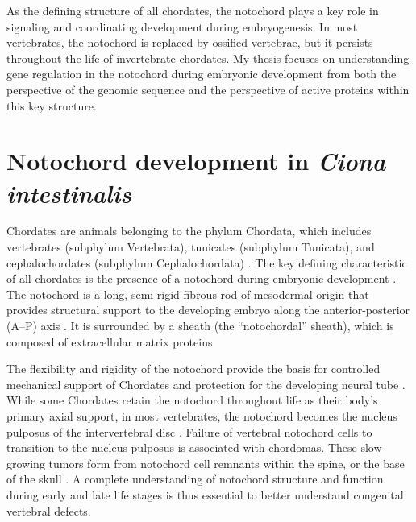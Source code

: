 \begin{dissertationintroduction}
    As the defining structure of all chordates, the notochord plays a key role in signaling and coordinating development during embryogenesis. In most vertebrates, the notochord is replaced by ossified vertebrae, but it persists throughout the life of invertebrate chordates. My thesis focuses on understanding gene regulation in the notochord during embryonic development from both the perspective of the genomic sequence and the perspective of active proteins within this key structure. 
    
    \section{Notochord development in \textit{Ciona intestinalis}}
    Chordates are animals belonging to the phylum Chordata, which includes vertebrates (subphylum Vertebrata), tunicates (subphylum Tunicata), and cephalochordates (subphylum Cephalochordata) \cite{holland2005}. The key defining characteristic of all chordates is the presence of a notochord during embryonic development \cite{stemple2004, holland2005, stemple2005, corallo2015, balmer2016, debree2018}. The notochord is a long, semi-rigid fibrous rod of mesodermal origin that provides structural support to the developing embryo along the anterior-posterior (A–P) axis \cite{stemple2005, corallo2015, balmer2016}. It is surrounded by a sheath (the “notochordal” sheath), which is composed of extracellular matrix proteins \cite{corallo2015, stemple2004, stemple2005}

    The flexibility and rigidity of the notochord provide the basis for controlled mechanical support of Chordates and protection for the developing neural tube \cite{stemple2004, stemple2005, corallo2015, balmer2016}. While some Chordates retain the notochord throughout life as their body’s primary axial support, in most vertebrates, the notochord becomes the nucleus pulposus of the intervertebral disc \cite{stemple2005, corallo2015, lawson2015, balmer2016}. Failure of vertebral notochord cells to transition to the nucleus pulposus is associated with chordomas. These slow-growing tumors form from notochord cell remnants within the spine, or the base of the skull \cite{corallo2015, debree2018}. A complete understanding of notochord structure and function during early and late life stages is thus essential to better understand congenital vertebral defects.


\end{dissertationintroduction}
